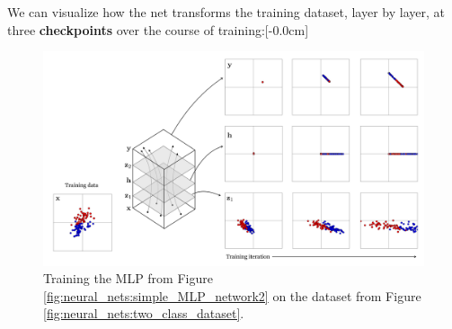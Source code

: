 We can visualize how the net transforms the training dataset, layer by layer, at three {\bf checkpoints} over the course of training:[-0.0cm]
\begin{figure}[h]
    \centerline{
    \includegraphics[width=1.0\linewidth]{./figures/neural_nets/binary_classifier_example_training_iters.pdf}
    }
    \caption{Training the MLP from Figure \ref{fig:neural_nets:simple_MLP_network2} on the dataset from Figure \ref{fig:neural_nets:two_class_dataset}.}
    \label{fig:intro_to_learning:neural_nets/binary_classifier_example_training_iters}
\end{figure}


